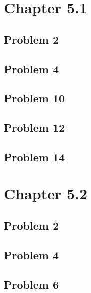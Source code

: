 \documentclass{article}%
\begin{document}
\section*{Chapter 5.1}

\subsection*{Problem 2}

\subsection*{Problem 4}

\subsection*{Problem 10}

\subsection*{Problem 12}

\subsection*{Problem 14}

\section*{Chapter 5.2}

\subsection*{Problem 2}

\subsection*{Problem 4}

\subsection*{Problem 6}
\end{document}
